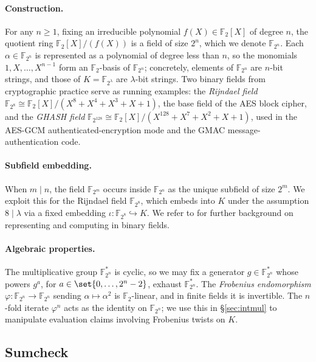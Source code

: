 \documentclass{article}
\theoremstyle{definition}
\newcommand{\FF}[1]{\mathbb{F}_{#1}}
\begin{document}
\paragraph{Construction.}
For any $n \geq 1$, fixing an irreducible polynomial $f(X) \in \FF{2}[X]$ of degree $n$, the quotient ring $\FF{2}[X] / (f(X))$ is a field of size $2^n$, which we denote $\FF{2^n}$. Each $\alpha \in \FF{2^n}$ is represented as a polynomial of degree less than $n$, so the monomials $1, X, \ldots, X^{n - 1}$ form an $\FF{2}$-basis of $\FF{2^n}$; concretely, elements of $\FF{2^n}$ are $n$-bit strings, and those of $K = \FF{2^\lambda}$ are $\lambda$-bit strings. Two binary fields from cryptographic practice serve as running examples: the \emph{Rijndael field} $\FF{2^8} \cong \FF{2}[X] / (X^8 + X^4 + X^3 + X + 1)$, the base field of the AES block cipher, and the \emph{GHASH field} $\FF{2^{128}} \cong \FF{2}[X] / (X^{128} + X^7 + X^2 + X + 1)$, used in the AES-GCM authenticated-encryption mode and the GMAC message-authentication code.

\paragraph{Subfield embedding.}
When $m \mid n$, the field $\FF{2^m}$ occurs inside $\FF{2^n}$ as the unique subfield of size $2^m$. We exploit this for the Rijndael field $\FF{2^8}$, which embeds into $K$ under the assumption $8 \mid \lambda$ via a fixed embedding $\iota \colon \FF{2^8} \hookrightarrow K$. We refer to \cite{Diamond:2024ab} for further background on representing and computing in binary fields.

\paragraph{Algebraic properties.}
The multiplicative group $\FF{2^n}^*$ is cyclic, so we may fix a generator $g \in \FF{2^n}^*$ whose powers $g^a$, for $a \in \set{0, \ldots, 2^n - 2}$, exhaust $\FF{2^n}^*$. The \emph{Frobenius endomorphism} $\varphi \colon \FF{2^n} \to \FF{2^n}$ sending $\alpha \mapsto \alpha^2$ is $\FF{2}$-linear, and in finite fields it is invertible. The $n$-fold iterate $\varphi^n$ acts as the identity on $\FF{2^n}$; we use this in \S\ref{sec:intmul} to manipulate evaluation claims involving Frobenius twists on $K$.

\subsection{Sumcheck}
\label{sec:sumcheck}
\end{document}

